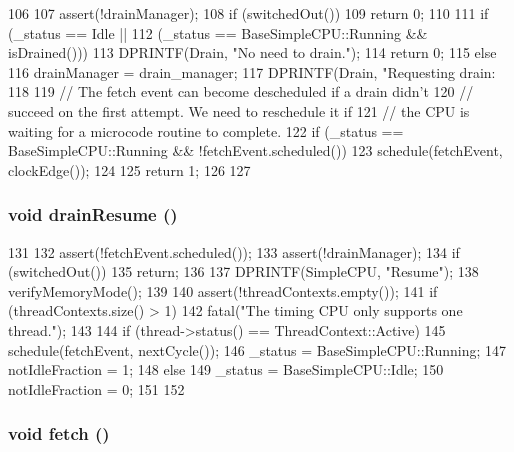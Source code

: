 \begin{DoxyCode}
106 {
107     assert(!drainManager);
108     if (switchedOut())
109         return 0;
110 
111     if (_status == Idle ||
112         (_status == BaseSimpleCPU::Running && isDrained())) {
113         DPRINTF(Drain, "No need to drain.\n");
114         return 0;
115     } else {
116         drainManager = drain_manager;
117         DPRINTF(Drain, "Requesting drain: %
118 
119         // The fetch event can become descheduled if a drain didn't
120         // succeed on the first attempt. We need to reschedule it if
121         // the CPU is waiting for a microcode routine to complete.
122         if (_status == BaseSimpleCPU::Running && !fetchEvent.scheduled())
123             schedule(fetchEvent, clockEdge());
124 
125         return 1;
126     }
127 }
\end{DoxyCode}
\hypertarget{classTimingSimpleCPU_a8f020d3237536fe007fc488c4125c5d8}{
\subsubsection[{drainResume}]{\setlength{\rightskip}{0pt plus 5cm}void drainResume ()}}
\label{classTimingSimpleCPU_a8f020d3237536fe007fc488c4125c5d8}



\begin{DoxyCode}
131 {
132     assert(!fetchEvent.scheduled());
133     assert(!drainManager);
134     if (switchedOut())
135         return;
136 
137     DPRINTF(SimpleCPU, "Resume\n");
138     verifyMemoryMode();
139 
140     assert(!threadContexts.empty());
141     if (threadContexts.size() > 1)
142         fatal("The timing CPU only supports one thread.\n");
143 
144     if (thread->status() == ThreadContext::Active) {
145         schedule(fetchEvent, nextCycle());
146         _status = BaseSimpleCPU::Running;
147         notIdleFraction = 1;
148     } else {
149         _status = BaseSimpleCPU::Idle;
150         notIdleFraction = 0;
151     }
152 }
\end{DoxyCode}
\hypertarget{classTimingSimpleCPU_a3865f8ea93e31d9b5d2726a80c0de966}{
\subsubsection[{fetch}]{\setlength{\rightskip}{0pt plus 5cm}void fetch ()}}
\label{classTimingSimpleCPU_a3865f8ea93e31d9b5d2726a80c0de966}



